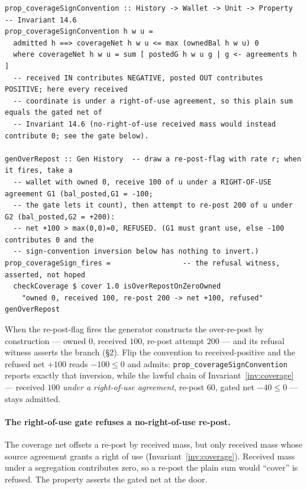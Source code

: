 \documentclass[11pt,a4paper]{article}
\begin{document}
\begin{lstlisting}
prop_coverageSignConvention :: History -> Wallet -> Unit -> Property  -- Invariant 14.6
prop_coverageSignConvention h w u =
  admitted h ==> coverageNet h w u <= max (ownedBal h w u) 0
  where coverageNet h w u = sum [ postedG h w u g | g <- agreements h ]
  -- received IN contributes NEGATIVE, posted OUT contributes POSITIVE; here every received
  -- coordinate is under a right-of-use agreement, so this plain sum equals the gated net of
  -- Invariant 14.6 (no-right-of-use received mass would instead contribute 0; see the gate below).

genOverRepost :: Gen History  -- draw a re-post-flag with rate r; when it fires, take a
  -- wallet with owned 0, receive 100 of u under a RIGHT-OF-USE agreement G1 (bal_posted,G1 = -100;
  -- the gate lets it count), then attempt to re-post 200 of u under G2 (bal_posted,G2 = +200):
  -- net +100 > max(0,0)=0, REFUSED. (G1 must grant use, else -100 contributes 0 and the
  -- sign-convention inversion below has nothing to invert.)
prop_coverageSign_fires =                 -- the refusal witness, asserted, not hoped
  checkCoverage $ cover 1.0 isOverRepostOnZeroOwned
    "owned 0, received 100, re-post 200 -> net +100, refused" genOverRepost
\end{lstlisting}

When the re-post-flag fires the generator constructs the over-re-post by construction
--- owned $0$, received $100$, re-post attempt $200$ --- and its refusal witness asserts
the branch (\S 2). Flip the convention to received-positive and the refused net $+100$ reads
$-100 \le 0$ and admits: \texttt{prop\_coverageSignConvention} reports exactly that
inversion, while the lawful chain of Invariant~\ref{inv:coverage} --- received $100$
\emph{under a right-of-use agreement}, re-post $60$, gated net $-40 \le 0$ --- stays admitted.

\paragraph{The right-of-use gate refuses a no-right-of-use re-post.}
The coverage net offsets a re-post by received mass, but only received mass whose
source agreement grants a right of use (Invariant~\ref{inv:coverage}). Received mass
under a segregation contributes zero, so a re-post the plain sum would ``cover'' is
refused. The property asserts the gated net at the door.
\end{document}

